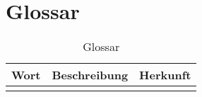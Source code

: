 \chapter*{Glossar}
  \begin{longtable}{|p{3cm}|p{7cm}|p{4cm}|}
      \caption{Glossar}\\
\hline
  Wort & Beschreibung & Herkunft\\
  \hline
  & &\\
  \hline
  \end{longtable}


